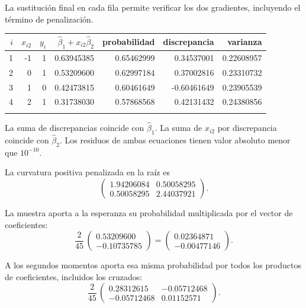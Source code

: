 \documentclass[11pt,a4paper]{article}
\begin{document}
La sustitución final en cada fila permite verificar
los dos gradientes, incluyendo el término de penalización.
\begin{center}\scriptsize
\begin{tabular}{rrrrrrr}\toprule
\(i\)&\(x_{i2}\)&\(y_i\)&\(\widehat\beta_1+x_{i2}\widehat\beta_2\)&probabilidad&discrepancia&varianza\\\midrule
1&-1&1&0.63945385&0.65462999&0.34537001&0.22608957\\
2&0&1&0.53209600&0.62997184&0.37002816&0.23310732\\
3&1&0&0.42473815&0.60461649&-0.60461649&0.23905539\\
4&2&1&0.31738030&0.57868568&0.42131432&0.24380856\\
\\\bottomrule\end{tabular}\end{center}
La suma de discrepancias coincide con \(\widehat\beta_1\).
La suma de \(x_{i2}\) por discrepancia coincide con
\(\widehat\beta_2\). Los residuos de ambas ecuaciones
tienen valor absoluto menor que \(10^{-10}\).

La curvatura positiva penalizada en la raíz es
\[
\begin{pmatrix}1.94206084&0.50058295\\0.50058295&2.44037921\end{pmatrix}.
\]

La muestra aporta a la esperanza su probabilidad
multiplicada por el vector de coeficientes:
\[
\frac{2}{45}\,\begin{pmatrix}0.53209600\\-0.10735785\end{pmatrix}=\begin{pmatrix}0.02364871\\-0.00477146\end{pmatrix}.
\]

A los segundos momentos aporta esa misma probabilidad
por todos los productos de coeficientes, incluidos los cruzados:
\[
\frac{2}{45}\,\begin{pmatrix}0.28312615&-0.05712468\\-0.05712468&0.01152571\end{pmatrix}.
\]
\end{document}

